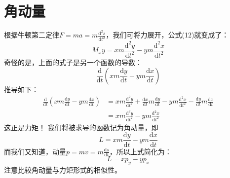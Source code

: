 \section{角动量}
根据牛顿第二定律$F=ma=m\frac{\textrm{d}^2 s}{\textrm{d}t^2}$，我们可将力展开，公式(12)就变成了：
\begin{equation}
  M_xy=xm\frac{\textrm{d}^2 y}{\textrm{d}t^2}-ym\frac{\textrm{d}^2 x}{\textrm{d}t^2}
\end{equation}
奇怪的是，上面的式子是另一个函数的导数：
\begin{equation}
  \frac{\textrm{d}}{\textrm{d}t}\left(xm\frac{\textrm{d}y}{\textrm{d}t}-ym\frac{\textrm{d}x}{\textrm{d}t}\right)
\end{equation}
推导如下：
\begin{align}\nonumber
  \frac{\textrm{d}}{\textrm{d}t}\left(xm\frac{\textrm{d}y}{\textrm{d}t}-ym\frac{\textrm{d}x}{\textrm{d}t}\right)&=xm\frac{\textrm{d}^2 y}{\textrm{d}t^2}+\frac{\textrm{d}x}{\textrm{d}t}m\frac{\textrm{d}y}{\textrm{d}t}-ym\frac{\textrm{d}^2x}{\textrm{d}t^2}-\frac{\textrm{d}y}{\textrm{d}t}m \frac{\textrm{d}x}{\textrm{d}t}\\
  &=xm\frac{\textrm{d}^2 y}{\textrm{d}t^2}-ym\frac{\textrm{d}^2 x}{\textrm{d}t^2}
\end{align}
这正是力矩！
我们将被求导的函数记为角动量，即
\begin{equation}
  L=xm\frac{\textrm{d}y}{\textrm{d}t}-ym\frac{\textrm{d}x}{\textrm{d}t}
\end{equation}
而我们又知道，动量$p=mv=m\frac{\textrm{d}s}{\textrm{d}t}$，所以上式简化为：
\begin{equation}
  L=xp_y-yp_x
\end{equation}
注意比较角动量与力矩形式的相似性。
